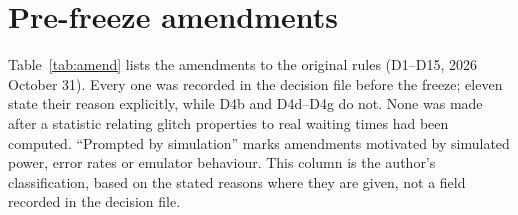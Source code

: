 \documentclass[fleqn,usenatbib]{mnras}
\begin{document}
\appendix
\section{Pre-freeze amendments}\label{app:amend}
Table~\ref{tab:amend} lists the amendments to the original rules (D1--D15,
2026 October 31). Every one was recorded in the decision file before the
freeze; eleven state their reason explicitly, while D4b and D4d--D4g do
not. None was made after a statistic relating glitch
properties to real waiting times had been computed. ``Prompted by
simulation'' marks amendments motivated by simulated power, error rates or
emulator behaviour. This column is the author's classification, based on
the stated reasons where they are given, not a field recorded in the
decision file.
\end{document}
